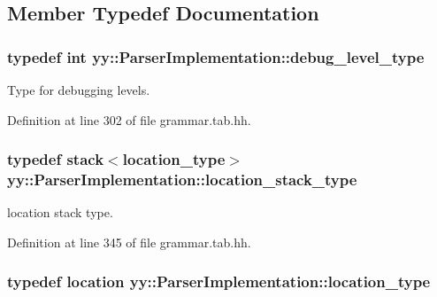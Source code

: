 \subsection{Member Typedef Documentation}
\hypertarget{classyy_1_1_parser_implementation_a3bc045d9c5422457dac380fd02718406}{
\subsubsection[{debug\_\-level\_\-type}]{\setlength{\rightskip}{0pt plus 5cm}typedef int {\bf yy::ParserImplementation::debug\_\-level\_\-type}}}
\label{classyy_1_1_parser_implementation_a3bc045d9c5422457dac380fd02718406}


Type for debugging levels. 



Definition at line 302 of file grammar.tab.hh.

\hypertarget{classyy_1_1_parser_implementation_ada3aecfd4e2e1bc7928ee6cd1c0d4b49}{
\subsubsection[{location\_\-stack\_\-type}]{\setlength{\rightskip}{0pt plus 5cm}typedef {\bf stack}$<${\bf location\_\-type}$>$ {\bf yy::ParserImplementation::location\_\-stack\_\-type}}}
\label{classyy_1_1_parser_implementation_ada3aecfd4e2e1bc7928ee6cd1c0d4b49}


location stack type. 



Definition at line 345 of file grammar.tab.hh.

\hypertarget{classyy_1_1_parser_implementation_a4fa212b147b509e1f912727f1a1dd750}{
\subsubsection[{location\_\-type}]{\setlength{\rightskip}{0pt plus 5cm}typedef {\bf location} {\bf yy::ParserImplementation::location\_\-type}}}
\label{classyy_1_1_parser_implementation_a4fa212b147b509e1f912727f1a1dd750}


